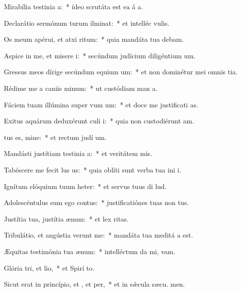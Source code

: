 \item Mirabília testinia a:~* ídeo scrutáta est ea á a.
\item Declarátio sermónum turum ilminat:~* et intelléc  vulis.
\item Os meum apérui, et atxi ritum:~* quia mandáta tua debam.
\item Aspice in me, et misere i:~* secúndum judícium diligéntium  um.
\item Gressus meos dírige secúndum equium um:~* et non dominétur mei omnis tia.
\item Rédime me a caniis minum:~* ut custódiam man a.
\item Fáciem tuam illúmina super vum um:~* et doce me justificati as.
\item Exitus aquárum deduxérunt culi i:~* quia non custodiérunt  am.
\item {}tus es, mine:~* et rectum judí um.
\item Mandásti justítiam testinia a:~* et veritátem  mis.
\item Tabéscere me fecit lus us:~* quia oblíti sunt verba tua ini i.
\item Ignítum elóquium tuum heter:~* et servus tuus di lud.
\item Adolescéntulus sum ego  contus:~* justificatiónes tuas non  tus.
\item Justítia tua, justítia  ænum:~* et lex  ritas.
\item Tribulátio, et angústia verunt me:~* mandáta tua meditá a est.
\item Æquitas testimónia tua  ænum:~* intelléctum da mi,  vam.
\item Glória tri, et lio,~* et Spirí to.
\item Sicut erat in princípio, et , et per,~* et in sǽcula sæcu. men.
